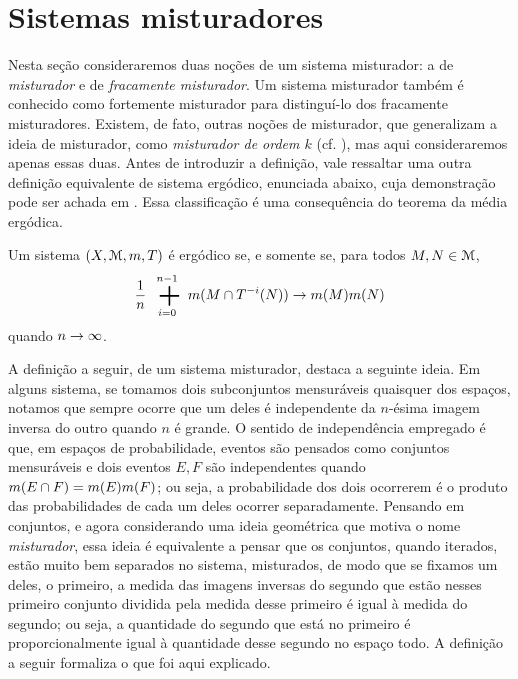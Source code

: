 \section{Sistemas misturadores}

Nesta seção consideraremos duas noções de um sistema misturador: a de \emph{misturador} e de \emph{fracamente misturador}. Um sistema misturador também é conhecido como fortemente misturador para distinguí-lo dos fracamente misturadores. Existem, de fato, outras noções de misturador, que generalizam a ideia de misturador, como \emph{misturador de ordem $k$} (cf. \cite{ein}), mas aqui consideraremos apenas essas duas. Antes de introduzir a definição, vale ressaltar uma outra definição equivalente de sistema ergódico, enunciada abaixo, cuja demonstração pode ser achada em \cite{ein}. Essa classificação é uma consequência do teorema da média ergódica.

\begin{proposition}
	Um sistema $(X,\mathcal{M},m,T)$ é ergódico se, e somente se, para todos $M,N \in \mathcal{M}$,
	\begin{equation*}
	\frac{1}{n} \sum_{i=0}^{n-1} \med(M \cap T^{-i}(N)) \conv \med(M)\med(N)
	\end{equation*}
quando $n \rightarrow \infty$.
\end{proposition}

	A definição a seguir, de um sistema misturador, destaca a seguinte ideia. Em alguns sistema, se tomamos dois subconjuntos mensuráveis quaisquer dos espaços, notamos que sempre ocorre que um deles é independente da $n$-ésima imagem inversa do outro quando $n$ é grande. O sentido de independência empregado é que, em espaços de probabilidade, eventos são pensados como conjuntos mensuráveis e dois eventos $E,F$ são independentes quando $m(E \cap F)=m(E)m(F)$; ou seja, a probabilidade dos dois ocorrerem é o produto das probabilidades de cada um deles ocorrer separadamente. Pensando em conjuntos, e agora considerando uma ideia geométrica que motiva o nome \emph{misturador}, essa ideia é equivalente a pensar que os conjuntos, quando iterados, estão muito bem separados no sistema, misturados, de modo que se fixamos um deles, o primeiro, a medida das imagens inversas do segundo que estão nesses primeiro conjunto dividida pela medida desse primeiro é igual à medida do segundo; ou seja, a quantidade do segundo que está no primeiro é proporcionalmente igual à quantidade desse segundo no espaço todo. A definição a seguir formaliza o que foi aqui explicado.

